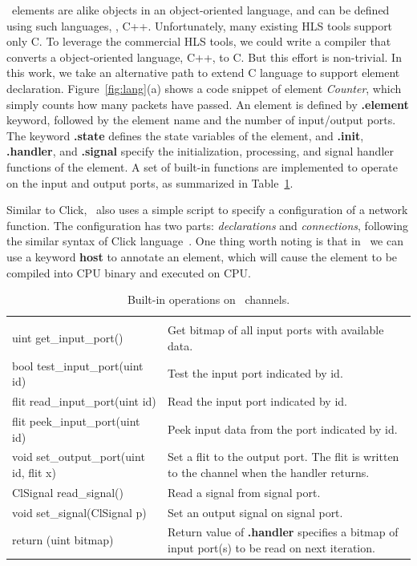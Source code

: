 \name\ elements are alike objects in an object-oriented language, and can be defined using such languages, \ie, C++.
Unfortunately, many existing HLS tools support only C. 
To leverage the commercial HLS tools, we could write a compiler that converts a object-oriented language, \eg C++, to C.
But this effort is non-trivial.
In this work, we take an alternative path to extend C language to support element declaration.
Figure~\ref{fig:lang}(a) shows a code snippet of element \textit{Counter}, which simply counts how many packets have
passed. An element is defined by \textbf{.element} keyword, followed by the element name and the number of input/output ports.
The keyword \textbf{.state} defines the state variables of the element, and \textbf{.init}, \textbf{.handler}, and \textbf{.signal}
specify the initialization, processing, and signal handler functions of the element.
A set of built-in functions are implemented to operate on the input and output ports, as summarized in Table~\ref{tab:built-in}.

Similar to Click, \name\ also uses a simple script to specify a configuration of a network function. The configuration has
two parts: \textit{declarations} and \textit{connections}, following the similar syntax of Click language~\cite{kohler2000click}.
One thing worth noting is that in \name\, we can use a keyword \textbf{host} to annotate an element, which will cause 
the element to be compiled into CPU binary and executed on CPU.

\begin{table}
\vspace{-10pt}
\centering
\caption{Built-in operations on \name\ channels.}
\label{tab:built-in}
\small
\begin{tabular}{p{}|p{4cm} }
\toprule \\
uint get\_input\_port() & Get bitmap of all input ports with available data. \\
\midrule
bool test\_input\_port(uint id) & Test the input port indicated by id. \\
\midrule
flit read\_input\_port(uint id) & Read the input port indicated by id. \\
\midrule
flit peek\_input\_port(uint id) & Peek input data from the port indicated by id. \\
\midrule
void set\_output\_port(uint id, flit x) & Set a flit to the output port. The flit is written to the channel when the handler returns.\\
\midrule
ClSignal read\_signal() & Read a signal from signal port.\\
\midrule
void set\_signal(ClSignal p) & Set an output signal on signal port.\\
\midrule
return (uint bitmap) & Return value of \textbf{.handler} specifies a bitmap of input port(s) to be read on next iteration. \\
\bottomrule
\end{tabular}
\vspace{-10pt}
\end{table}

